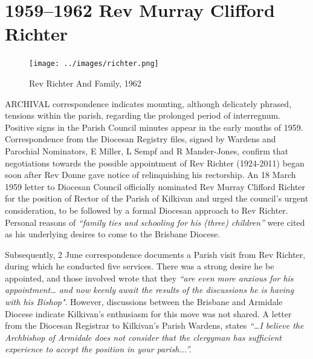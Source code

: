 \balance


\printendnotes[custom]
\setcounter{endnote}{0}
\chapter{1959--1962 Rev Murray Clifford Richter}
\nobalance








\begin{figure}
\begin{center}
\texttt{[image: ../images/richter.png]}
\caption{Rev Richter And Family, 1962}
\end{center}
\end{figure}




\lettrine[lines=3]{A}{RCHIVAL}
 correspondence indicates mounting, although delicately phrased, tensions within the parish, regarding the prolonged period of interregnum. Positive signs in the Parish Council minutes appear in the early months of 1959. Correspondence from the Diocesan Registry files, signed by Wardens and Parochial Nominators, E Miller, L Sempf and R Mander-Jones, confirm that negotiations towards the possible appointment of Rev Richter (1924-2011) began soon after Rev Donne gave notice of relinquishing his rectorship. An 18 March 1959 letter to Diocesan Council officially nominated Rev Murray Clifford Richter for the position of Rector of the Parish of Kilkivan and urged the council's urgent consideration, to be followed by a formal Diocesan approach to Rev Richter. Personal reasons of \emph{``family ties and schooling for his (three) children''} were cited as his underlying desires to come to the Brisbane Diocese.

Subsequently, 2 June correspondence documents a Parish visit from Rev Richter, during which he conducted five services. There was a strong desire he be appointed, and those involved wrote that they \emph{``are even more anxious for his appointment\ldots{} and now keenly await the results of the discussions he is having with his Bishop"}. However, discussions between the Brisbane and Armidale Diocese indicate Kilkivan's enthusiasm for this move was not shared. A letter from the Diocesan Registrar to Kilkivan's Parish Wardens, states \emph{``\ldots I believe the Archbishop of Armidale does not consider that the clergyman has sufficient experience to accept the position in your parish...''.}



